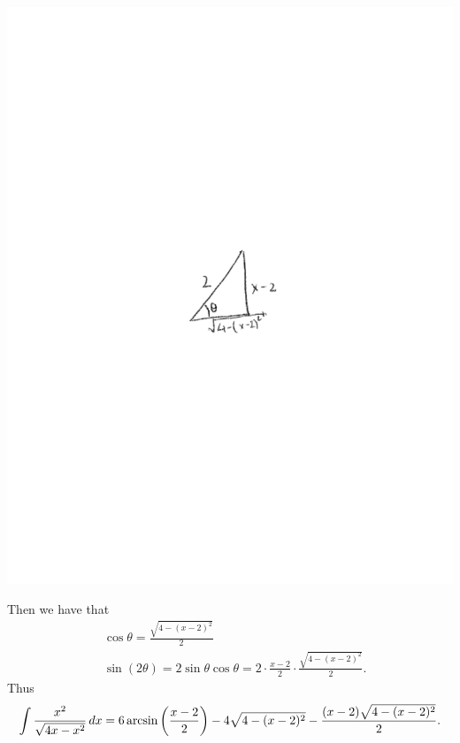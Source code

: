 \documentclass[handout,instructornotes]{ximera}
\begin{document}
\begin{problem}
\begin{enumerate}
\begin{freeResponse}
		\begin{image}
		\includegraphics[trim= 270 350 250 330]{Figure7-4-2.pdf}
		\end{image}
		
	Then we have that
		\begin{align*}
		&\cos \theta = \frac{\sqrt{4-(x-2)^2}}{2}  \\
		&\sin(2\theta) = 2 \sin \theta \cos \theta = 2 \cdot \frac{x-2}{2} \cdot \frac{\sqrt{4-(x-2)^2}}{2}.
		\end{align*}
	Thus
		\[
		\int \frac{x^2}{\sqrt{4x-x^2}} \,d x = 6\arcsin \left( \frac{x-2}{2} \right) - 4\sqrt{4-(x-2)^2} - \frac{(x-2)\sqrt{4-(x-2)^2}}{2}.
		\]
	\end{freeResponse}


\end{enumerate}
\end{problem}
\end{document}
